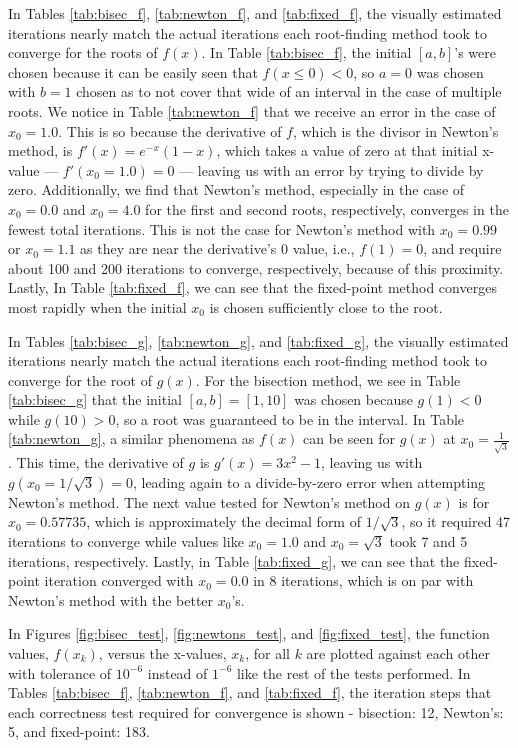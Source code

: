 \documentclass[11pt]{article}
\begin{document}
In Tables \ref{tab:bisec_f}, \ref{tab:newton_f}, and \ref{tab:fixed_f}, the visually estimated iterations nearly match the actual iterations each root-finding method took to converge for the roots of $f(x)$. In Table \ref{tab:bisec_f}, the initial $[a,b]$'s were chosen because it can be easily seen that $f(x \leq 0) < 0$, so $a = 0$ was chosen with $b=1$ chosen as to not cover that wide of an interval in the case of multiple roots. We notice in Table \ref{tab:newton_f} that we receive an error in the case of $x_0 = 1.0$. This is so because the derivative of $f$, which is the divisor in Newton's method, is $f'(x) = e^{-x}(1-x)$, which takes a value of zero at that initial x-value --- $f'(x_0 = 1.0) = 0$ --- leaving us with an error by trying to divide by zero. Additionally, we find that Newton's method, especially in the case of $x_0 = 0.0$ and $x_0 = 4.0$ for the first and second roots, respectively, converges in the fewest total iterations. This is not the case for Newton's method with $x_0 = 0.99$ or $x_0 = 1.1$ as they are near the derivative's 0 value, i.e., $f(1) = 0$, and require about 100 and 200 iterations to converge, respectively, because of this proximity. Lastly, In Table \ref{tab:fixed_f}, we can see that the fixed-point method converges most rapidly when the initial $x_0$ is chosen sufficiently close to the root.

In Tables \ref{tab:bisec_g}, \ref{tab:newton_g}, and \ref{tab:fixed_g}, the visually estimated iterations nearly match the actual iterations each root-finding method took to converge for the root of $g(x)$. For the bisection method, we see in Table \ref{tab:bisec_g} that the initial $[a,b] = [1,10]$ was chosen because $g(1) < 0$ while $g(10) > 0$, so a root was guaranteed to be in the interval. In Table \ref{tab:newton_g}, a similar phenomena as $f(x)$ can be seen for $g(x)$ at $x_0 = \frac{1}{\sqrt{3}}$. This time, the derivative of $g$ is $g'(x) = 3x^2 - 1$, leaving us with $g(x_0 = 1/\sqrt{3}) = 0$, leading again to a divide-by-zero error when attempting Newton's method. The next value tested for Newton's method on $g(x)$ is for $x_0 = 0.57735$, which is approximately the decimal form of $1/\sqrt{3}$, so it required 47 iterations to converge while values like $x_0 = 1.0$ and $x_0 = \sqrt{3}$ took 7 and 5 iterations, respectively. Lastly, in Table \ref{tab:fixed_g}, we can see that the fixed-point iteration converged with $x_0 = 0.0$ in 8 iterations, which is on par with Newton's method with the better $x_0$'s.

In Figures \ref{fig:bisec_test}, \ref{fig:newtons_test}, and \ref{fig:fixed_test}, the function values, $f(x_k)$, versus the x-values, $x_k$, for all $k$ are plotted against each other with tolerance of $10^{-6}$ instead of $1^{-6}$ like the rest of the tests performed. In Tables \ref{tab:bisec_f}, \ref{tab:newton_f}, and \ref{tab:fixed_f}, the iteration steps that each correctness test required for convergence is shown -  bisection: 12, Newton's: 5, and fixed-point: 183.
\end{document}
